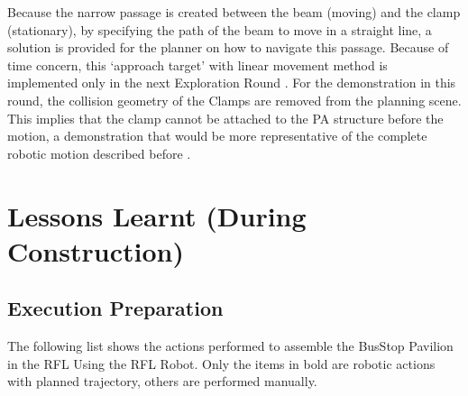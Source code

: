 Because the narrow passage is created between the beam (moving) and the clamp (stationary), by specifying the path of the beam to move in a straight line, a solution is provided for the planner on how to navigate this passage. 
Because of time concern, this ‘approach target’ with linear movement method is implemented only in the next Exploration Round . For the demonstration in this round, the collision geometry of the Clamps are removed from the planning scene. This implies that the clamp cannot be attached to the PA structure before the  motion, a demonstration that would be more representative of the complete robotic motion described before .

\section{Lessons Learnt (During Construction)}
\label{section:exploration-2-lessons-learnt-during-construction}

\subsection{Execution Preparation}
\label{subsection:exploration-2-execution-plan}

The following list shows the actions performed to assemble the BusStop Pavilion in the RFL Using the RFL Robot. Only the items in bold are robotic actions with planned trajectory, others are performed manually. 

